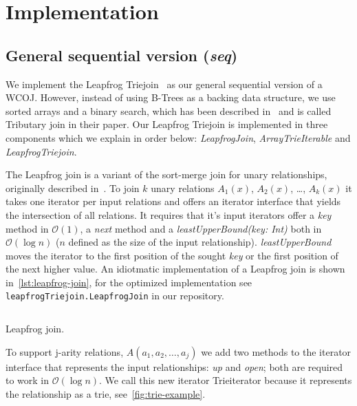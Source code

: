 \section{Implementation}\label{sec:implementation}

\subsection{General sequential version (\textit{seq})}\label{ssec:seq-implementation}
We implement the Leapfrog Triejoin~\cite{leapfrog} as our general sequential version of a WCOJ.
However, instead of using B-Trees as a backing data structure, we use sorted arrays and a binary
search, which has been described in~\cite{myria-detailed} and is called
Tributary join in their paper.
Our Leapfrog Triejoin is implemented in three components which we explain in order below: \textit{LeapfrogJoin}, \textit{ArrayTrieIterable} and
\textit{LeapfrogTriejoin}.

The Leapfrog join is a variant of the sort-merge join for unary relationships, originally described in~\cite{leapfrog1,leapfrog2}. %
To join $k$ unary relations $A_1(x)$, $A_2(x)$, \dots, $A_k(x)$ it takes one iterator per input relations and offers an iterator
interface that yields the intersection of all relations.
It requires that it's input iterators offer a \textit{key} method in $\mathcal{O}(1)$, a \textit{next} method and
a \textit{leastUpperBound(key: Int)} both in $\mathcal{O} (\log n)$ ($n$ defined as the size of the input relationship).
\textit{leastUpperBound} moves the iterator to the first position of the sought \textit{key} or the first position of the
next higher value.
An idiotmatic implementation of a Leapfrog join is shown in~\cref{lst:leapfrog-join}, for the optimized implementation see
\texttt{leapfrogTriejoin.LeapfrogJoin} in our repository.  %

\begin{listing}[H]
    \inputminted[linenos=true]{scala}{code/LeapfrogJoin.scala}
    \caption{Leapfrog join.}
    \label{lst:leapfrog-join}
\end{listing}

To support j-arity relations, $A(a_1, a_2, \dots, a_j)$ we add two methods to the iterator interface that represents the input
relationships: \textit{up} and \textit{open}; both are required to work in $\mathcal{O} (\log n)$.
We call this new iterator Trieiterator because it represents the relationship as a trie, see~\cref{fig:trie-example}.

